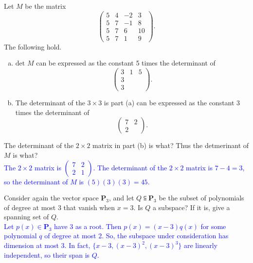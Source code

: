 \documentclass[a4paper,11pt]{article}
\newcommand{\PP}{\mathbf{P}}
\newcommand{\BB}[1]{\textcolor{blue}{#1}}
\begin{document}
 Let $M$ be the matrix
\[
  \left(
    \begin{array}{rrrr}
      5 & 4 & -2 & 3 \\
      5 & 7 & -1 & 8 \\
      5 & 7 & 6 & 10 \\
      5 & 7 & 1 & 9
    \end{array}
  \right).
\]
The following hold.
\begin{enumerate}[(a)]
\item $\text{det }M$ can be expressed as the constant 5 times the determinant of
  \[
    \left(
      \begin{array}{rrr}
        3 & 1 & 5 \\
        3 & & \\
        3 & & 
      \end{array}
    \right).
  \]
\item The determinant of the $3 \times 3$ is part (a) can be expressed as the
  constant 3 times the determinant of
  \[
    \left(
      \begin{array}{rr}
        7 & 2 \\
        2 &
      \end{array}
    \right).
  \]
\end{enumerate}
The determinant of the $2 \times 2$ matrix in part (b) is what? Thus the
detmerinant of $M$ is what? \\

\BB{The $2 \times 2$ matrix is
  $\left( \begin{smallmatrix}7&2\\2&1\end{smallmatrix} \right)$. The determinant
of the $2 \times 2$ matrix is $7-4=3$, so the determinant of $M$ is
$(5)(3)(3)=45$. \\}

 Consider again the vector space $\PP_3$, and let
$Q \subseteqq \PP_3$ be the subset of polynomials of degree at most 3 that
vanish when $x=3$. Is $Q$ a subspace? If it is, give a spanning set of $Q$. \\

\BB{Let $p(x) \in \PP_3$ have 3 as a root. Then $p(x)=(x-3)q(x)$ for some
  polynomial $q$ of degree at most 2. So, the subspace under consideration has
  dimension at most 3. In fact, $\{x-3,(x-3)^2,(x-3)^3\}$ are linearly
  independent, so their span is $Q$.}
\end{document}
